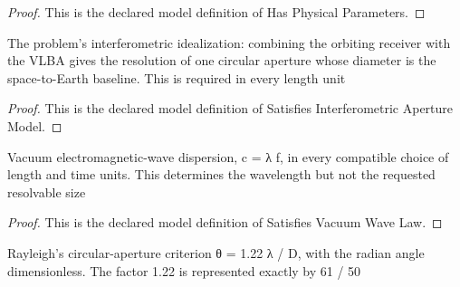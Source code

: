 \begin{proof}
  This is the declared model definition of Has Physical Parameters.
\end{proof}
\begin{definition}
  \label{def:physics:phyx-mini-0123:phyxminiproblems-problemphyxmini0123-satisfiesinterferometricaperturemodel}
  The problem's interferometric idealization: combining the orbiting receiver with the VLBA gives the resolution of one circular aperture whose diameter is the space-to-Earth baseline. This is required in every length unit
\end{definition}
\begin{proof}
  This is the declared model definition of Satisfies Interferometric Aperture Model.
\end{proof}
\begin{definition}
  \label{def:physics:phyx-mini-0123:phyxminiproblems-problemphyxmini0123-satisfiesvacuumwavelaw}
  Vacuum electromagnetic-wave dispersion, c = λ f, in every compatible choice of length and time units. This determines the wavelength but not the requested resolvable size
\end{definition}
\begin{proof}
  This is the declared model definition of Satisfies Vacuum Wave Law.
\end{proof}
\begin{definition}
  \label{def:physics:phyx-mini-0123:phyxminiproblems-problemphyxmini0123-satisfiesrayleighcriterion}
  Rayleigh's circular-aperture criterion θ = 1.22 λ / D, with the radian angle dimensionless. The factor 1.22 is represented exactly by 61 / 50
\end{definition}
